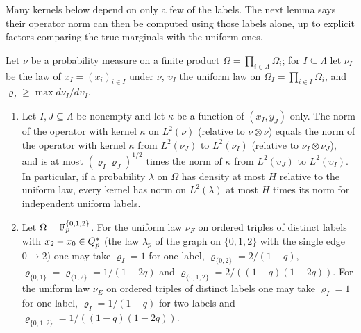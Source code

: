 Many kernels below depend on only a few of the labels. The next
lemma says their operator norm can then be computed using those
labels alone, up to explicit factors comparing the true marginals
with the uniform ones.

\begin{lemma}\label{lem:record:projection}
Let $\nu$ be a probability measure on a finite product
$\Omega=\prod_{i\in\Lambda}\Omega_i$; for $I\subseteq\Lambda$ let $\nu_I$ be the
law of $x_I=(x_i)_{i\in I}$ under $\nu$, $\upsilon_I$ the uniform law on
$\Omega_I=\prod_{i\in I}\Omega_i$, and $\varrho_I\ge\max d\nu_I/d\upsilon_I$.
\begin{enumerate}[label=\textup{(\alph*)}]
\item Let $I,J\subseteq\Lambda$ be nonempty and let $\kappa$ be a function of
  $(x_I,y_J)$ only. The norm of the operator with kernel $\kappa$ on $L^2(\nu)$
  (relative to $\nu\otimes\nu$) equals the norm of the operator with kernel
  $\kappa$ from $L^2(\nu_J)$ to $L^2(\nu_I)$ (relative to $\nu_I\otimes\nu_J$), and
  is at most $(\varrho_I\varrho_J)^{1/2}$ times the norm of $\kappa$ from
  $L^2(\upsilon_J)$ to $L^2(\upsilon_I)$. In particular, if a probability $\lambda$ on
  $\Omega$ has density at most $H$ relative to the uniform law, every kernel has
  norm on $L^2(\lambda)$ at most $H$ times its norm for independent uniform
  labels.
\item Let $\Omega=\mathbb F_p^{\{0,1,2\}}$. For the uniform law $\nu_F$ on ordered
  triples of distinct labels with $x_2-x_0\in Q_{p}^{*}$ (the law $\lambda_p$ of the
  graph on $\{0,1,2\}$ with the single edge $0\to2$) one may take $\varrho_I=1$
  for one label, $\varrho_{\{0,2\}}=2/(1-q)$,
  $\varrho_{\{0,1\}}=\varrho_{\{1,2\}}=1/(1-2q)$ and
  $\varrho_{\{0,1,2\}}=2/((1-q)(1-2q))$. For the uniform law $\nu_E$ on ordered
  triples of distinct labels one may take $\varrho_I=1$ for one label,
  $\varrho_I=1/(1-q)$ for two labels and $\varrho_{\{0,1,2\}}=1/((1-q)(1-2q))$.
\end{enumerate}
\end{lemma}

